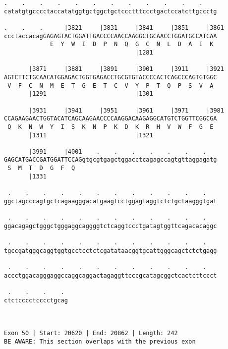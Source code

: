 \documentclass{article}
\begin{document}
\begin{Verbatim}
.    .    .    .    .    .    .    .    .    .    .    .    
catatgtgcccctaccatatggtgctggctgctccctttccctgactccatcttgccctg
                                                            
.    .    .      |3821     |3831     |3841     |3851     |3861
ccctaccacagGAGAGTACTGGATTGACCCCAACCAAGGCTGCAACCTGGATGCCATCAA
             E  Y  W  I  D  P  N  Q  G  C  N  L  D  A  I  K 
                                     |1281                  
  
       |3871     |3881     |3891     |3901     |3911     |3921
AGTCTTCTGCAACATGGAGACTGGTGAGACCTGCGTGTACCCCACTCAGCCCAGTGTGGC
 V  F  C  N  M  E  T  G  E  T  C  V  Y  P  T  Q  P  S  V  A 
       |1291                         |1301                  
  
       |3931     |3941     |3951     |3961     |3971     |3981
CCAGAAGAACTGGTACATCAGCAAGAACCCCAAGGACAAGAGGCATGTCTGGTTCGGCGA
 Q  K  N  W  Y  I  S  K  N  P  K  D  K  R  H  V  W  F  G  E 
       |1311                         |1321                  
  
       |3991     |4001    .    .    .    .    .    .    .   
GAGCATGACCGATGGATTCCAGgtgcgtgagctggacctcagagccagtgttaggagatg
 S  M  T  D  G  F  Q                                        
       |1331                                                
  
 .    .    .    .    .    .    .    .    .    .    .    .   
ggctagcccagtgctcagaagggacatgaagtcctggagtaggtctctgctaagggtgat
                                                            
 .    .    .    .    .    .    .    .    .    .    .    .   
ggacagagctgggctgggaggcaggggtctcaggtccctgatagtggttcagacacaggc
                                                            
 .    .    .    .    .    .    .    .    .    .    .    .   
tgccgatgggcaggtggtgcctcctctcgatataacggtgcattgggcagctctctgagg
                                                            
 .    .    .    .    .    .    .    .    .    .    .    .   
accctggacagggaggccaggcaggactagaggttcccgcatagcggctcactcttccct
                                                            
 .    .    .    . 
ctctcccctcccctgcag
                  
                  
 
Exon 50 | Start: 20620 | End: 20862 | Length: 242
BE AWARE: This section overlaps with the previous exon




\end{Verbatim}
\end{document}
